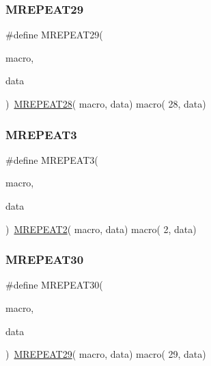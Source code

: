 \mbox{\label{group__group__sam0__utils__mrepeat_ga45db5721fbef0548ff66d27c2d7c4393}} 
\subsubsection{\texorpdfstring{MREPEAT29}{MREPEAT29}}
{\footnotesize\ttfamily \#define M\+R\+E\+P\+E\+A\+T29(\begin{DoxyParamCaption}\item[{}]{macro,  }\item[{}]{data }\end{DoxyParamCaption})~\mbox{\hyperlink{group__group__sam0__utils__mrepeat_gab45193969a834715c8a19fc7c2d4a173}{M\+R\+E\+P\+E\+A\+T28}}( macro, data)   macro( 28, data)}

\mbox{\label{group__group__sam0__utils__mrepeat_ga94781fc45639d838e3f23e352aa3dc63}} 
\subsubsection{\texorpdfstring{MREPEAT3}{MREPEAT3}}
{\footnotesize\ttfamily \#define M\+R\+E\+P\+E\+A\+T3(\begin{DoxyParamCaption}\item[{}]{macro,  }\item[{}]{data }\end{DoxyParamCaption})~\mbox{\hyperlink{group__group__sam0__utils__mrepeat_gad5dcb0f9f91771b2e3e42b48d347cb76}{M\+R\+E\+P\+E\+A\+T2}}(  macro, data)   macro(  2, data)}

\mbox{\label{group__group__sam0__utils__mrepeat_ga7b2a77fc380778a167d44b347ac338a8}} 
\subsubsection{\texorpdfstring{MREPEAT30}{MREPEAT30}}
{\footnotesize\ttfamily \#define M\+R\+E\+P\+E\+A\+T30(\begin{DoxyParamCaption}\item[{}]{macro,  }\item[{}]{data }\end{DoxyParamCaption})~\mbox{\hyperlink{group__group__sam0__utils__mrepeat_ga45db5721fbef0548ff66d27c2d7c4393}{M\+R\+E\+P\+E\+A\+T29}}( macro, data)   macro( 29, data)}

